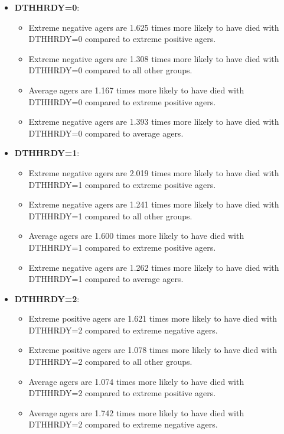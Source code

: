 \documentclass[twocolumn]{article}
\begin{document}
\begin{itemize}
    \item \textbf{DTHHRDY=0}:
    \begin{itemize}
        \item Extreme negative agers are 1.625 times more likely to have died with DTHHRDY=0 compared to extreme positive agers.
        \item Extreme negative agers are 1.308 times more likely to have died with DTHHRDY=0 compared to all other groups.
        \item Average agers are 1.167 times more likely to have died with DTHHRDY=0 compared to extreme positive agers.
        \item Extreme negative agers are 1.393 times more likely to have died with DTHHRDY=0 compared to average agers.
    \end{itemize}

    \item \textbf{DTHHRDY=1}:
    \begin{itemize}
        \item Extreme negative agers are 2.019 times more likely to have died with DTHHRDY=1 compared to extreme positive agers.
        \item Extreme negative agers are 1.241 times more likely to have died with DTHHRDY=1 compared to all other groups.
        \item Average agers are 1.600 times more likely to have died with DTHHRDY=1 compared to extreme positive agers.
        \item Extreme negative agers are 1.262 times more likely to have died with DTHHRDY=1 compared to average agers.
    \end{itemize}

    \item \textbf{DTHHRDY=2}:
    \begin{itemize}
        \item Extreme positive agers are 1.621 times more likely to have died with DTHHRDY=2 compared to extreme negative agers.
        \item Extreme positive agers are 1.078 times more likely to have died with DTHHRDY=2 compared to all other groups.
        \item Average agers are 1.074 times more likely to have died with DTHHRDY=2 compared to extreme positive agers.
        \item Average agers are 1.742 times more likely to have died with DTHHRDY=2 compared to extreme negative agers.
    \end{itemize}


\end{itemize}
\end{document}
